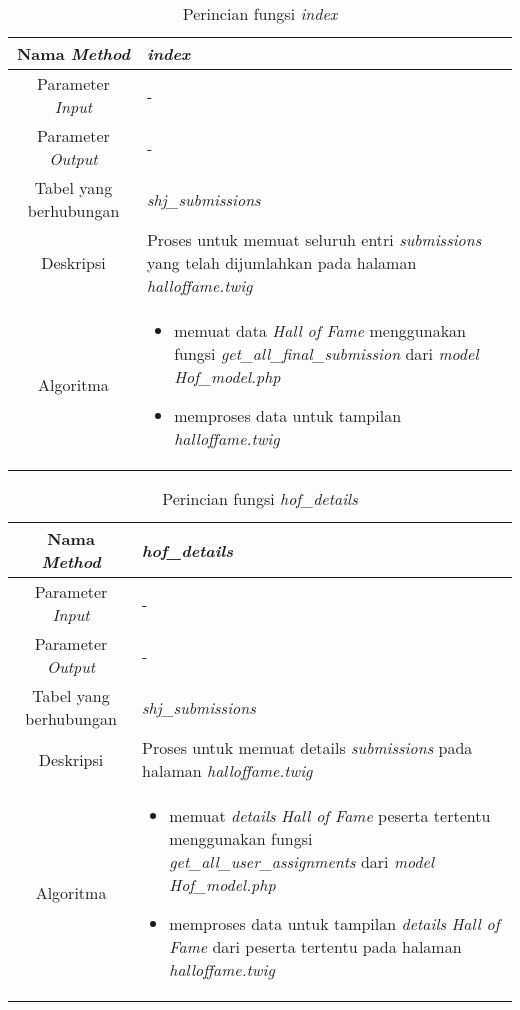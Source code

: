 \begin{enumerate}
	\begin{table}[H]
		\caption{Perincian fungsi \textit{index}}
		\begin{tabular}{|c|p{11cm}|}
			\hline
			Nama \textit{Method} 	& 	\textit{index} 	\\
			\hline
			Parameter \textit{Input} & - \\
			\hline
			Parameter \textit{Output} &  - \\
			\hline
			Tabel yang berhubungan & \textit{shj\_submissions} \\
			\hline
			Deskripsi	& Proses untuk memuat seluruh entri \textit{submissions} yang telah dijumlahkan pada halaman \textit{halloffame.twig}	 \\
			\hline
			Algoritma	& \begin{itemize}
				\item memuat data \textit{Hall of Fame} menggunakan fungsi \textit{get\_all\_final\_submission} dari \textit{model Hof\_model.php}
				\item memproses data untuk tampilan \textit{halloffame.twig}
			\end{itemize} \\
			\hline
		\end{tabular}
	\end{table}
	
	\begin{table}[H]
		\caption{Perincian fungsi \textit{hof\_details}}
		\begin{tabular}{|c|p{11cm}|}
			\hline
			Nama \textit{Method} 	& 	\textit{hof\_details} 	\\
			\hline
			Parameter \textit{Input} & - \\
			\hline
			Parameter \textit{Output} &  - \\
			\hline
			Tabel yang berhubungan & \textit{shj\_submissions} \\
			\hline
			Deskripsi	& Proses untuk memuat details \textit{submissions} pada halaman \textit{halloffame.twig}	 \\
			\hline
			Algoritma	& \begin{itemize}
				\item memuat \textit{details} \textit{Hall of Fame} peserta tertentu menggunakan fungsi \textit{get\_all\_user\_assignments} dari \textit{model Hof\_model.php}
				\item memproses data untuk tampilan \textit{details} \textit{Hall of Fame} dari peserta tertentu pada halaman \textit{halloffame.twig}
			\end{itemize} \\
			\hline
		\end{tabular}
	\end{table}
\end{enumerate}

